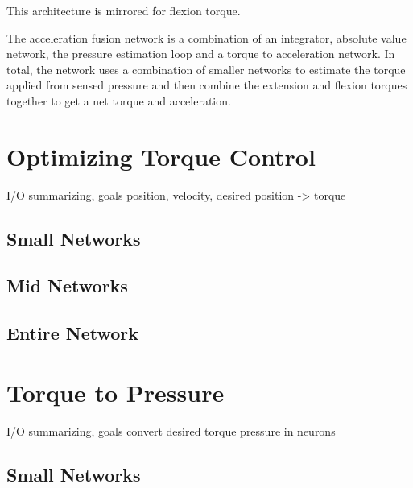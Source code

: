 
This architecture is mirrored for flexion torque.




The acceleration fusion network is a combination of an integrator, absolute
value network, the pressure estimation loop and a torque to acceleration
network. In total, the network uses a combination of smaller networks to
estimate the torque applied from sensed pressure and then combine the extension
and flexion torques together to get a net torque and acceleration.

\section{Optimizing Torque Control}

I/O summarizing, goals
position, velocity, desired position -> torque

\subsection{Small Networks}


\subsection{Mid Networks}


\subsection{Entire Network}


\section{Torque to Pressure}

I/O summarizing, goals
convert desired torque pressure in neurons

\subsection{Small Networks}


